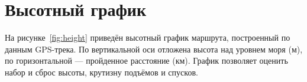 \chapter{Высотный график}
\label{ch:heightgraph}

На рисунке~\ref{fig:height} приведён высотный график маршрута, построенный по данным GPS-трека. По вертикальной оси отложена высота над уровнем моря (м), по горизонтальной — пройденное расстояние (км). График позволяет оценить набор и сброс высоты, крутизну подъёмов и спусков.


